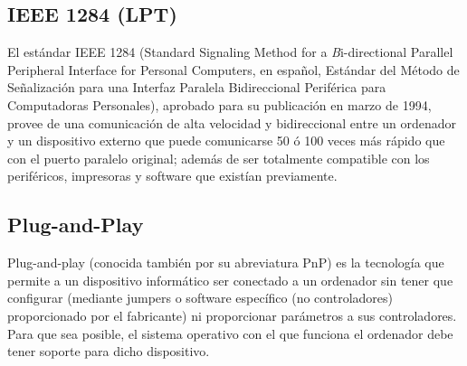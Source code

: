 \documentclass[12pt,oneside,a4paper]{article}
\begin{document}
	\subsection{IEEE 1284 (LPT)}\label{sub:ieee 1284 (lpt)}
		
		El estándar IEEE 1284 (Standard Signaling Method for a {\emph Bi-directional
		Parallel Peripheral Interface for Personal Computers}, en español,
		Estándar del Método de Señalización para una Interfaz Paralela
		Bidireccional Periférica para Computadoras Personales), aprobado para
		su publicación en marzo de 1994, provee de una comunicación de alta
		velocidad y bidireccional entre un ordenador y un dispositivo externo
		que puede comunicarse 50 ó 100 veces más rápido que con el puerto
		paralelo original; además de ser totalmente compatible con los
		periféricos, impresoras y software que existían previamente.

		\cite{LPT}

	\subsection{Plug-and-Play}\label{sub:plug-and-play}
	
		Plug-and-play (conocida también por su abreviatura PnP) es la
		tecnología que permite a un dispositivo informático ser conectado a un
		ordenador sin tener que configurar (mediante jumpers o software
		específico (no controladores) proporcionado por el fabricante) ni
		proporcionar parámetros a sus controladores. Para que sea posible, el
		sistema operativo con el que funciona el ordenador debe tener soporte
		para dicho dispositivo.

		\cite{plugandplay}

\newpage

\clearpage

\end{document}
